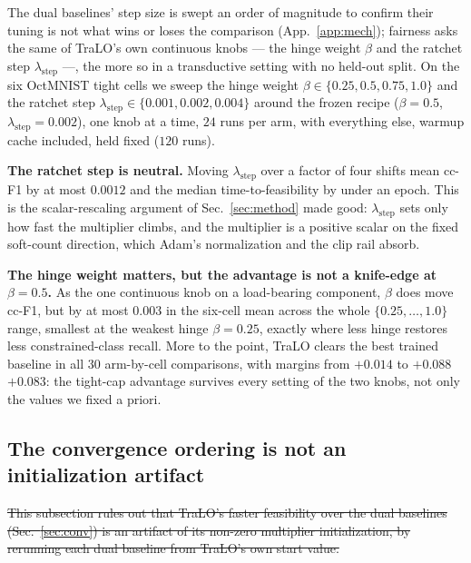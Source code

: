 \documentclass[10pt]{article}
\newcommand{\del}[1]{{\color{red}\sout{#1}}}
\begin{document}
The dual baselines' step size is swept an order of magnitude to confirm
their tuning is not what wins or loses the comparison
(App.~\ref{app:mech}); fairness asks the same of TraLO's own
continuous knobs{\color{blue} --- the hinge weight $\beta$ and the ratchet step
$\lambda_{\text{step}}$ ---}, the more so in a transductive setting with no
held-out split. On the six OctMNIST tight cells we sweep the hinge
weight $\beta\in\{0.25,0.5,0.75,1.0\}$ and the ratchet step
$\lambda_{\text{step}}\in\{0.001,0.002,0.004\}$ around the frozen
recipe ($\beta{=}0.5$, $\lambda_{\text{step}}{=}0.002$), one knob at a
time, $24$ runs per arm, with everything else, warmup cache included,
held fixed ($120$ runs).

\textbf{The ratchet step is neutral.} Moving $\lambda_{\text{step}}$
over a factor of four shifts mean cc-F1 by at most $0.0012$ and the
median time-to-feasibility by under an epoch. This is the
scalar-rescaling argument of Sec.~\ref{sec:method} made good:
$\lambda_{\text{step}}$ sets only how fast the multiplier climbs, and
the multiplier is a positive scalar on the fixed soft-count direction,
which Adam's normalization and the clip rail absorb.

\textbf{The hinge weight matters, but the advantage is not a
knife-edge at $\beta{=}0.5$.} As the one continuous knob on a
load-bearing component, $\beta$ does move cc-F1, but by at most $0.003$
in the six-cell mean across the whole $\{0.25,\dots,1.0\}$ range,
smallest at the weakest hinge $\beta{=}0.25$, exactly where less hinge
restores less constrained-class recall. More to the point, TraLO
clears the best trained baseline in all $30$ arm-by-cell comparisons,
with margins from $+0.014$ to \del{$+0.088$}{\color{blue}$+0.083$}: the tight-cap advantage
survives every setting of the two knobs, not only the values we fixed
a priori.

\subsection{The convergence ordering is not an initialization artifact}
\label{app:init}

\del{This subsection rules out that TraLO's faster feasibility over the dual
baselines (Sec.~\ref{sec:conv}) is an artifact of its non-zero multiplier
initialization, by rerunning each dual baseline from TraLO's own start
value.}
\end{document}
